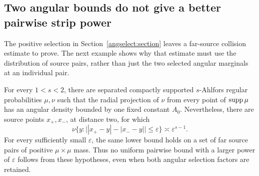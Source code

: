 \subsection{Two angular bounds do not give a better pairwise strip power}
\label{angularobs:section}

The positive selection in Section~\ref{angselect:section} leaves a
far-source collision estimate to prove. The next example shows why that
estimate must use the distribution of source pairs, rather than just the
two selected angular marginals at an individual pair.

\begin{proposition}\label{angularobs:proposition}
For every \(1<s<2\), there are separated compactly supported
\(s\)-Ahlfors regular probabilities \(\mu,\nu\) such that the radial
projection of \(\nu\) from every point of \(\operatorname{supp}\mu\) has an
angular density bounded by one fixed constant \(A_0\). Nevertheless,
there are source points \(x_+,x_-\), at distance two, for which
\[
 \nu\{y:\bigl||x_+-y|-|x_--y|\bigr|\le\varepsilon\}
 \asymp\varepsilon^{s-1}.
\]
For every sufficiently small \(\varepsilon\), the same lower bound
holds on a set of far source pairs of positive \(\mu\times\mu\)
mass. Thus no uniform pairwise bound with a larger power of
\(\varepsilon\) follows from these hypotheses, even when both angular
selection factors are retained.
\end{proposition}

